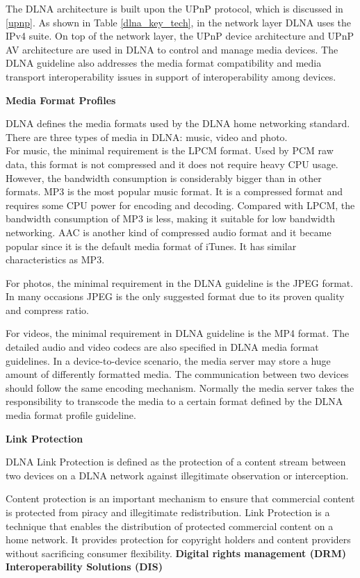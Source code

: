 The DLNA architecture is built upon the UPnP protocol, which is discussed in
\ref{upnp}. As shown in Table \ref{dlna_key_tech}, in the network layer DLNA
uses the IPv4 suite. On top of the network layer, the UPnP device architecture and UPnP AV architecture are used in DLNA to control
and manage media devices. The DLNA guideline also addresses the media format
compatibility and media transport interoperability issues in support of
interoperability among devices.

\textbf{Media Format Profiles}

DLNA defines the media formats used by the DLNA home networking 
standard. There are three types of media in DLNA: music, video and photo.\\
For music, the minimal requirement is the LPCM format. Used by PCM raw data,
this format is not compressed and it does not require heavy CPU usage. However,
the bandwidth consumption is considerably bigger than in other formats. MP3 is
the most popular music format. It is a compressed format and requires some CPU
power for encoding and decoding. Compared with LPCM, the bandwidth consumption
of MP3 is less, making it suitable for low bandwidth networking. AAC is another
kind of compressed audio format and it became popular since it is the default
media format of iTunes. It has similar characteristics as MP3.

For photos, the minimal requirement in the DLNA guideline is the JPEG format. In
many occasions JPEG is the only suggested format due to its proven quality and
compress ratio.

For videos, the minimal requirement in DLNA guideline is the MP4 format. The
detailed audio and video codecs are also specified in DLNA media format
guidelines. In a device-to-device scenario, the media server may store a huge
amount of differently formatted media. The communication between two devices
should follow the same encoding mechanism. Normally the media server takes the
responsibility to transcode the media to a certain format defined by the DLNA
media format profile guideline.

\textbf{Link Protection}

DLNA Link Protection is defined as the protection of a content stream between two 
devices on a DLNA network against illegitimate observation or interception.

Content protection is an important mechanism to ensure that commercial content is protected 
from piracy and illegitimate redistribution. Link Protection is a technique that enables the
distribution of protected commercial content on a home network. It provides
protection for copyright holders and content providers without sacrificing
consumer flexibility.
\clearpage
\textbf{Digital rights management (DRM) Interoperability Solutions (DIS) }


